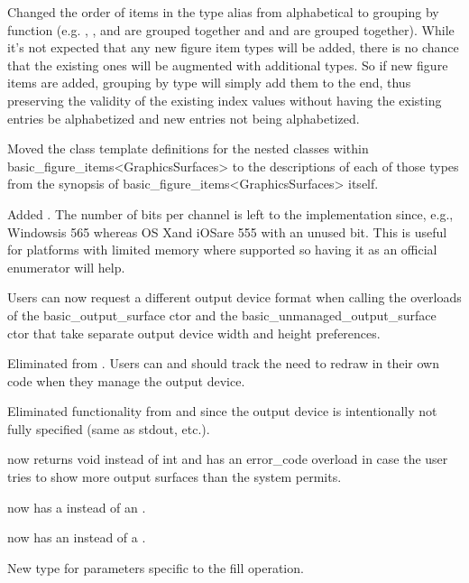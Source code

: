 \pnum
Changed the order of items in the  type alias from alphabetical to grouping by function (e.g. , , and  are grouped together and  and  are grouped together). While it's not expected that any new figure item types will be added, there is no chance that the existing ones will be augmented with additional types. So if new figure items are added, grouping by type will simply add them to the end, thus preserving the validity of the existing index values without having the existing entries be alphabetized and new entries not being alphabetized.

\pnum
Moved the class template definitions for the nested classes within basic_figure_items<GraphicsSurfaces> to the descriptions of each of those types from the synopsis of basic_figure_items<GraphicsSurfaces> itself.

\pnum
Added . The number of bits per channel is left to the implementation since, e.g., Windows\textregistered is 565 whereas OS X\textregistered and iOS\textregistered are 555 with an unused bit. This is useful for platforms with limited memory where supported so having it as an official enumerator will help. 

\pnum
Users can now request a different output device format when calling the overloads of the basic_output_surface ctor and the basic_unmanaged_output_surface ctor that take separate output device width and height preferences.

\pnum
Eliminated  from . Users can and should track the need to redraw in their own code when they manage the output device.

\pnum
Eliminated  functionality from  and  since the output device is intentionally not fully specified (same as stdout, etc.).

\pnum
{} now returns void instead of int and has an error_code overload in case the user tries to show more output surfaces than the system permits.

\pnum
{} now has a  instead of an .

\pnum
{} now has an  instead of a .

\pnum
New type  for parameters specific to the fill operation.

